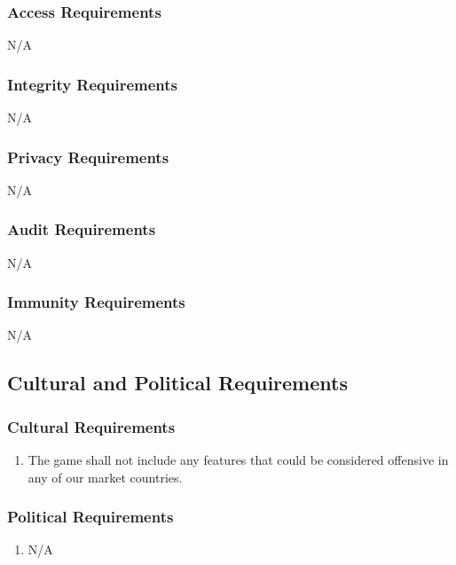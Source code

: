 \documentclass[12pt, titlepage]{article}
\begin{document}
\subsubsection{Access Requirements}
\label{ssub:access_requirements}
N/A

\subsubsection{Integrity Requirements}
\label{ssub:integrity_requirements}
N/A

\subsubsection{Privacy Requirements}
\label{ssub:privacy_requirements}
N/A

\subsubsection{Audit Requirements}
\label{ssub:audit_requirements}
N/A

\subsubsection{Immunity Requirements}
\label{ssub:immunity_requirements}
N/A


\subsection{Cultural and Political Requirements}
\label{sub:cultural_and_political_requirements}

\subsubsection{Cultural Requirements}
\label{ssub:cultural_requirements}
\begin{enumerate}[{CP}1. ]
        \item The game shall not include any features that could be considered offensive in any of our market countries.
\end{enumerate}

\subsubsection{Political Requirements}
\label{ssub:political_requirements}
\begin{enumerate}[]
        \item N/A
\end{enumerate}
\end{document}
